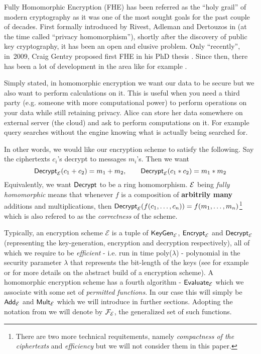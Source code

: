 Fully Homomorphic Encryption (FHE) has been referred as the ``holy grail'' of modern cryptography as it was one of the most sought goals for the past couple of decades. First formally introduced by Rivest, Adleman and Dertouzos in \cite{primal} (at the time called ``privacy homomorphism''), shortly after the discovery of public key cryptography, it has been an open and elusive problem. Only ``recently'', in~2009, Craig Gentry proposed first FHE in his PhD thesis \cite{gentry_phd}. Since then, there has been a lot of development in the area like for example .

Simply stated, in homomorphic encryption we want our data to be secure but we also want to perform calculations on it. This is useful when you need a third party (e.g. someone with more computational power) to perform operations on your data while still retaining privacy. Alice can store her data somewhere on external server (the cloud) and ask to perform computations on it. For example query searches without the engine knowing what is actually being searched for.

In other words, we would like our encryption scheme to satisfy the following. Say the ciphertexts $c_i$'s decrypt to messages $m_i$'s. Then we want
$$ \alg{Decrypt}_{\E}(c_1 + c_2) = m_1 + m_2, \qquad \alg{Decrypt}_{\E}(c_1*c_2) = m_1*m_2$$
Equivalently, we want $\alg{Decrypt}$ to be a ring homomorphism. $\mathcal{E}$ being \textit{fully homomorphic} means that whenever $f$ is a composition of \textbf{arbitrily many} additions and multiplications, then $\alg{Decrypt}_{\E}(f(c_1, \dots, c_n)) = f(m_1, \dots, m_n)$\footnote{There are two more technical requitements, namely \textit{compactness of the ciphertexts} and \textit{efficiency} but we will not consider them in this paper.} which is also refered to as the \textit{correctness} of the scheme.

\begin{remark} \label{algs}
    Typically, an encryption scheme $\mathcal{E}$ is a tuple of $\alg{KeyGen}_{\E}$, $\alg{Encrypt}_{\E}$ and $\alg{Decrypt}_{\E}$ (representing the key-generation, encryption and decryption respectively), all of which we require to be \textit{efficient} - i.e. run in time poly($\lambda$) - polynomial in the security parameter $\lambda$ that represents the bit-length of the keys (see for example \cite{katz} or \cite{book} for more details on the abstract build of a encryption scheme). A homomorphic encryption scheme has a fourth algorithm - $\alg{Evaluate}_{\E}$ which we associate with some set of \textit{permitted functions}. In our case this will simply be $\alg{Add}_{\E}$ and $\alg{Mult}_{\E}$ which we will introduce in further sections. Adopting the notation from \cite{easy_fhe} we will denote by $\mathcal{F}_{\mathcal{E}}$, the generalized set of such functions.
\end{remark}

